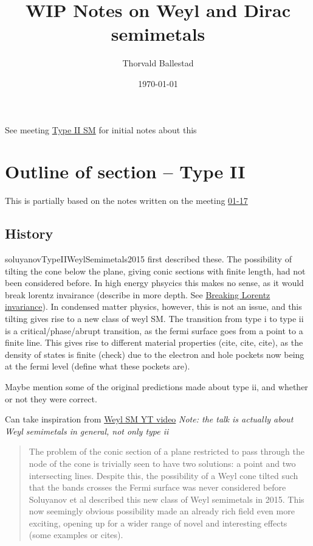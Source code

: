 \documentclass[11pt]{article}
\author{Thorvald Ballestad}
\date{\today}
\title{WIP Notes on Weyl and Dirac semimetals}
\begin{document}
\maketitle
\tableofcontents

See meeting \href{file:///home/thorvald/Documents/NTNU/10semester/meetings/01-17.org}{Type II SM} for initial notes about this


\section{Outline of section -- Type II}
\label{sec:orgcffdb16}
This is partially based on the notes written on the meeting \href{file:///home/thorvald/Documents/NTNU/10semester/meetings/01-17.org}{01-17}

\subsection{History}
\label{sec:org070ad8a}
soluyanovTypeIIWeylSemimetals2015 first described these.
The possibility of tilting the cone below the plane, giving conic sections with finite length, had not been considered before.
In high energy phsycics this makes no sense, as it would break lorentz invairance (describe in more depth. See \hyperref[sec:orgde4474d]{Breaking Lorentz invariance}).
In condensed matter physics, however, this is not an issue, and this tilting gives rise to a new class of weyl SM.
The transition from type i to type ii is a critical/phase/abrupt transition, as the fermi surface goes from a point to a finite line.
This gives rise to different material properties (cite, cite, cite), as the density of states is finite (check) due to the electron and hole pockets now being at the fermi level (define what these pockets are).

Maybe mention some of the original predictions made about type ii, and whether or not they were correct.

Can take inspiration from \hyperref[sec:org7941e69]{Weyl SM YT video}  \emph{Note: the talk is actually about Weyl semimetals in general, not only type ii}

\begin{quote}
The problem of the conic section of a plane restricted to pass through the node of the cone is trivially seen to have two solutions: a point and two intersecting lines.
Despite this, the possibility of a Weyl cone tilted such that the bands crosses the Fermi surface was never considered before Soluyanov et al described this new class of Weyl semimetals in 2015.
This now seemingly obvious possibility made an already rich field even more exciting, opening up for a wider range of novel and interesting effects (some examples or cites).
\end{quote}
\end{document}
